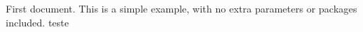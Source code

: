 \documentclass{article}
\begin{document}
First document.   This is a simple example, with no 
extra parameters or packages included.
teste
\end{document}
